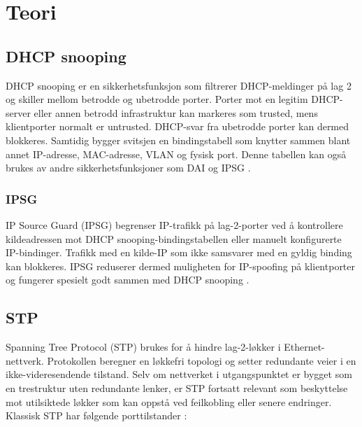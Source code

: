 
\section{Teori}

\subsection{DHCP snooping}

DHCP snooping er en sikkerhetsfunksjon som filtrerer DHCP-meldinger på lag 2 og skiller mellom betrodde og ubetrodde porter. Porter mot en legitim DHCP-server eller annen betrodd infrastruktur kan markeres som trusted, mens klientporter normalt er untrusted. DHCP-svar fra ubetrodde porter kan dermed blokkeres. Samtidig bygger svitsjen en bindingstabell som knytter sammen blant annet IP-adresse, MAC-adresse, VLAN og fysisk port. Denne tabellen kan også brukes av andre sikkerhetsfunksjoner som DAI og IPSG \cite{forsvaret_nettverk_rolle1}.

\subsubsection{IPSG}

IP Source Guard (IPSG) begrenser IP-trafikk på lag-2-porter ved å kontrollere kildeadressen mot DHCP snooping-bindingstabellen eller manuelt konfigurerte IP-bindinger. Trafikk med en kilde-IP som ikke samsvarer med en gyldig binding kan blokkeres. IPSG reduserer dermed muligheten for IP-spoofing på klientporter og fungerer spesielt godt sammen med DHCP snooping \cite{forsvaret_nettverk_rolle1}.

\subsection{STP}

Spanning Tree Protocol (STP) brukes for å hindre lag-2-løkker i Ethernet-nettverk. Protokollen beregner en løkkefri topologi og setter redundante veier i en ikke-videresendende tilstand. Selv om nettverket i utgangspunktet er bygget som en trestruktur uten redundante lenker, er STP fortsatt relevant som beskyttelse mot utilsiktede løkker som kan oppstå ved feilkobling eller senere endringer. Klassisk STP har følgende porttilstander \cite{cisco_stp_3850}:

